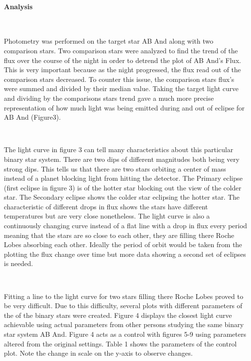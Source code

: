 \documentclass[12pt,twocolumn]{article}
\begin{document}
\paragraph{Analysis}

\ \


Photometry was performed on the target star AB And along with two comparison stars. Two comparison stars were analyzed to find the trend of the flux over the course of the night in order to detrend the plot of AB And's Flux. This is very important because as the night progressed, the flux read out of the comparison stars decreased. To counter this issue, the comparison stars flux's were summed and divided by their median value. Taking the target light curve and dividing by the comparisons stars trend gave a much more precise representation of how much light was being emitted during and out of eclipse for AB And (Figure3). 

\ \

The light curve in figure 3 can tell many characteristics about this particular binary star system. There are two dips of different magnitudes both being very strong dips. This tells us that there are two stars orbiting a center of mass instead of a planet blocking light from hitting the detector. The Primary eclipse (first eclipse in figure 3) is of the hotter star blocking out the view of the colder star. The Secondary eclipse shows the colder star eclipsing the hotter star. The characteristic of different drops in flux shows the stars have different temperatures but are very close nonetheless. The light curve is also a continuously changing curve instead of a flat line with a drop in flux every period meaning that the stars are so close to each other, they are filling there Roche Lobes absorbing each other. Ideally the period of orbit would be taken from the plotting the flux change over time but more data showing a second set of eclipses is needed.

\ \

Fitting a line to the light curve for two stars filling there Roche Lobes proved to be very difficult. Due to this difficulty, several plots with different parameters of the of the binary stars were created. Figure 4 displays the closest light curve achievable using actual parameters from other persons studying the same binary star system AB And. Figure 4 acts as a control with figures 5-9 using parameters altered from the original settings. Table 1 shows the parameters of the control plot. Note the change in scale on the y-axis to observe changes.
\end{document}
